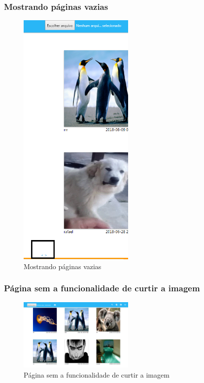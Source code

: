 \subsubsection{Mostrando páginas vazias}
\begin{figure}[ht]
	\centering
	\includegraphics[width=0.5\textwidth]{./imagens/paginas.png}
	\caption{Mostrando páginas vazias}
	\label{fig:casoDeUso}
\end{figure}

\pagebreak

\subsubsection{Página sem a funcionalidade de curtir a imagem}
\begin{figure}[ht]
	\centering
	\includegraphics[width=0.5\textwidth]{./imagens/botao_curtir.png}
	\caption{Página sem a funcionalidade de curtir a imagem}
	\label{fig:casoDeUso}
\end{figure}

